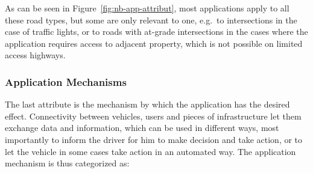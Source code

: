 As can be seen in Figure~\ref{fig:nb-app-attribut}, most applications apply to all these road types, but some are only relevant to one, e.g.\ to intersections in the case of traffic lights, or to roads with at-grade intersections in the cases where the application requires access to adjacent property, which is not possible on limited access highways. 


\subsubsection{Application Mechanisms}
The last attribute is the mechanism by which the application has the desired effect. Connectivity between vehicles, users and pieces of infrastructure let them exchange data and information, which can be used in different ways, most importantly to inform the driver for him to make decision and take action, or to let the vehicle in some cases take action in an automated way. The application mechanism is thus categorized as:



